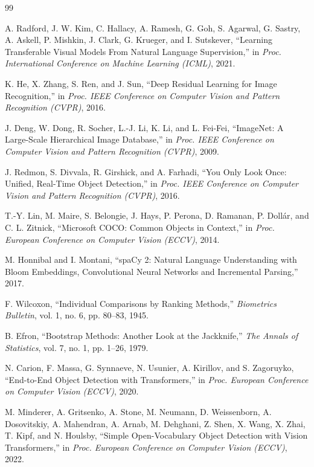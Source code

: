 \vspace{-1mm}
\begin{thebibliography}{99}
    \small

    A. Radford, J. W. Kim, C. Hallacy, A. Ramesh, G. Goh, S. Agarwal, G. Sastry, A. Askell, P. Mishkin, J. Clark, G. Krueger, and I. Sutskever,
    ``Learning Transferable Visual Models From Natural Language Supervision,''
    in {\it Proc. International Conference on Machine Learning (ICML)}, 2021.

    K. He, X. Zhang, S. Ren, and J. Sun,
    ``Deep Residual Learning for Image Recognition,''
    in {\it Proc. IEEE Conference on Computer Vision and Pattern Recognition (CVPR)}, 2016.

    J. Deng, W. Dong, R. Socher, L.-J. Li, K. Li, and L. Fei-Fei,
    ``ImageNet: A Large-Scale Hierarchical Image Database,''
    in {\it Proc. IEEE Conference on Computer Vision and Pattern Recognition (CVPR)}, 2009.

    J. Redmon, S. Divvala, R. Girshick, and A. Farhadi,
    ``You Only Look Once: Unified, Real-Time Object Detection,''
    in {\it Proc. IEEE Conference on Computer Vision and Pattern Recognition (CVPR)}, 2016.

    T.-Y. Lin, M. Maire, S. Belongie, J. Hays, P. Perona, D. Ramanan, P. Doll\'{a}r, and C. L. Zitnick,
    ``Microsoft COCO: Common Objects in Context,''
    in {\it Proc. European Conference on Computer Vision (ECCV)}, 2014.

    M. Honnibal and I. Montani,
    ``spaCy 2: Natural Language Understanding with Bloom Embeddings, Convolutional Neural Networks and Incremental Parsing,''
    2017.

    F. Wilcoxon,
    ``Individual Comparisons by Ranking Methods,''
    {\it Biometrics Bulletin}, vol. 1, no. 6, pp. 80--83, 1945.

    B. Efron,
    ``Bootstrap Methods: Another Look at the Jackknife,''
    {\it The Annals of Statistics}, vol. 7, no. 1, pp. 1--26, 1979.

    N. Carion, F. Massa, G. Synnaeve, N. Usunier, A. Kirillov, and S. Zagoruyko,
    ``End-to-End Object Detection with Transformers,''
    in {\it Proc. European Conference on Computer Vision (ECCV)}, 2020.

    M. Minderer, A. Gritsenko, A. Stone, M. Neumann, D. Weissenborn, A. Dosovitskiy, A. Mahendran, A. Arnab, M. Dehghani, Z. Shen, X. Wang, X. Zhai, T. Kipf, and N. Houlsby,
    ``Simple Open-Vocabulary Object Detection with Vision Transformers,''
    in {\it Proc. European Conference on Computer Vision (ECCV)}, 2022.


\end{thebibliography}
